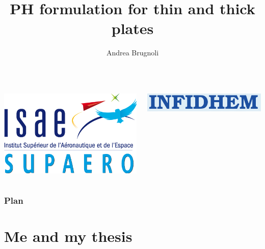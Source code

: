 \documentclass{beamer}
\title[INFIDHEM Workshop]{PH formulation for thin and thick plates}
\author[A. Brugnoli ISAE-SUPAERO]{\small Andrea Brugnoli}
\begin{document}
	
\begin{frame}
	\titlepage
\begin{columns}
	\begin{column}{0.5\textwidth}
		\centering
		\includegraphics[height=0.2\textheight]{ISAE-SUPAERO.PNG}
	\end{column}
	\begin{column}{0.5\textwidth}
		\centering
		\includegraphics[scale=0.3]{infidhem.png}
	\end{column}
\end{columns}

\end{frame}

\begin{frame}
\frametitle{Plan}
\small
\tableofcontents
\normalsize
\end{frame}

\section{Me and my thesis}
\end{document}
